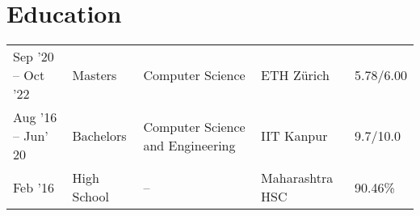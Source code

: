 %

\section*{Education}
\begin{tabulary}{\textwidth}{L L L L L}

\toprule
{} &  &  &  & \\
\midrule
Sep '20 -- Oct '22 & Masters & Computer Science & ETH Zürich & 5.78/6.00\\%
Aug '16 -- Jun' 20 & Bachelors & Computer Science and Engineering & IIT Kanpur & 9.7/10.0\\%
Feb '16 & High School & -- & Maharashtra HSC & 90.46\%\\%
\bottomrule

\end{tabulary}
